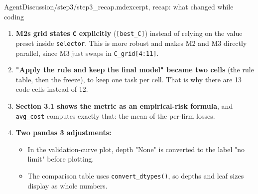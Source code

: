 \begin{mdfile}{AgentDiscussion/step3/step3\_recap.md}{excerpt, recap: what changed while coding}

\begin{enumerate}
\def\labelenumi{\arabic{enumi}.}
\tightlist
\item
  \textbf{M2\textquotesingle s grid states \texttt{C} explicitly} (\texttt{{[}best\_C{]}}) instead of relying on the value preset inside \texttt{selector}. This is more robust and makes M2 and M3 directly parallel, since M3 just swaps in \texttt{C\_grid{[}4:11{]}}.
\item
  \textbf{"Apply the rule and keep the final model" became two cells} (the rule table, then the freeze), to keep one task per cell. That is why there are 13 code cells instead of 12.
\item
  \textbf{Section 3.1 shows the metric as an empirical-risk formula}, and \texttt{avg\_cost} computes exactly that: the mean of the per-firm losses.
\item
  \textbf{Two pandas 3 adjustments:}

  \begin{itemize}
  \tightlist
  \item
    In the validation-curve plot, depth "None" is converted to the label "no limit" before plotting.
  \item
    The comparison table uses \texttt{convert\_dtypes()}, so depths and leaf sizes display as whole numbers.
  \end{itemize}
\end{enumerate}
\end{mdfile}
